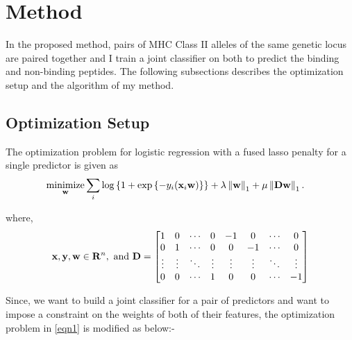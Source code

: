 \documentclass[conference,10pt,draftclsnofoot,onecolumn]{IEEEtran}
\begin{document}

\section{Method}
\label{sec:method}
In the proposed method, pairs of MHC Class II alleles of the same genetic locus are paired together and I train a joint classifier on both to predict the
binding and non-binding peptides. The following subsections describes the optimization setup and the algorithm of my method.

\subsection{Optimization Setup}
\label{subsec:optimization}
The optimization problem for logistic regression with a fused lasso penalty for a single predictor is given as
\begin{align}
\label{eqn1}
\mathop{\textrm{minimize}}_{\ww} & \sum_i \mylog{1 + \myexp{-y_i(\xx_i\ww)}} + \lambda\nrmo{\ww} + \mu\nrmo{\DD\ww}.
\end{align}


where,
\[
\mathbf{x}, \mathbf{y}, \mathbf{w} \in \mathbf{R}^n, 
\textrm{ and }
\mathbf{D} = \begin{bmatrix}   1 & 0 & \cdots & 0 & -1 & 0 & \cdots & 0\\
                        0 & 1 & \cdots & 0 & 0 & -1 & \cdots & 0\\
                        \vdots & \vdots & \ddots & \vdots & \vdots & \vdots & \ddots & \vdots\\
                        0 & 0 & \cdots & 1 & 0 & 0 & \cdots & -1 
      \end{bmatrix}
\]

Since, we want to build a joint classifier for a pair of predictors and want to impose a constraint on the weights of both of their features,
the optimization problem in \eqref{eqn1} is modified as below:-
\end{document}
